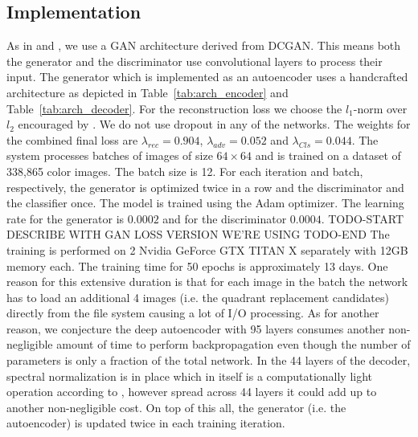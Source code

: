 \documentclass[12pt,a4paper]{article}
\begin{document}
\subsection{Implementation}
As in \cite{DisentFacOfVarByMixTh} and \cite{InfoGAN}, we use a GAN architecture derived from DCGAN. This means both the generator and the discriminator use convolutional layers to process their input. The generator which is implemented as an autoencoder uses a handcrafted architecture as depicted in Table~\ref{tab:arch_encoder} and Table~\ref{tab:arch_decoder}. For the reconstruction loss we choose the $l_1$-norm over $l_2$ encouraged by \cite{CondGAN_PatchGAN}. We do not use dropout in any of the networks. The weights for the combined final loss are $ \lambda_{rec} = 0.904$, $\lambda_{adv} = 0.052$ and $ \lambda_{Cls} = 0.044$. The system processes batches of images of size $64 \times 64$ and is trained on a dataset of 338,865 color images. The batch size is 12. For each iteration and batch, respectively, the generator is optimized twice in a row and the discriminator and the classifier once. The model is trained using the Adam optimizer. The learning rate for the generator is $0.0002$ and for the discriminator $0.0004$. TODO-START DESCRIBE WITH GAN LOSS VERSION WE'RE USING TODO-END The training is performed on 2 Nvidia GeForce GTX TITAN X separately with 12GB memory each. The training time for 50 epochs is approximately 13 days. One reason for this extensive duration is that for each image in the batch the network has to load an additional 4 images (i.e. the quadrant replacement candidates) directly from the file system causing a lot of I/O processing. As for another reason, we conjecture the deep autoencoder with 95 layers consumes another non-negligible amount of time to perform backpropagation even though the number of parameters is only a fraction of the total network. In the 44 layers of the decoder, spectral normalization is in place which in itself is a computationally light operation according to \cite{SNGAN}, however spread across 44 layers it could add up to another non-negligible cost. On top of this all, the generator (i.e. the autoencoder) is updated twice in each training iteration.

\end{document}
